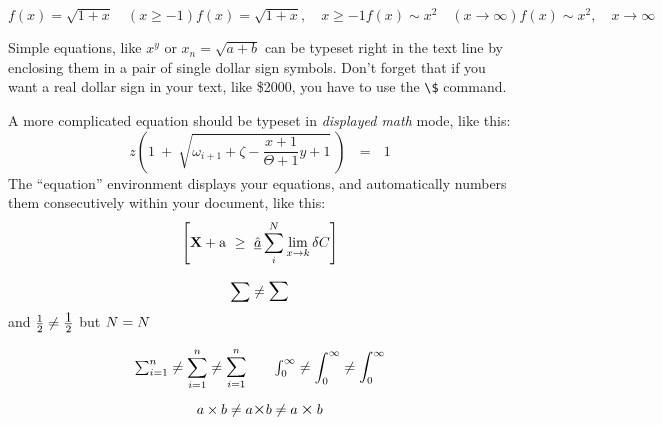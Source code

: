\documentclass[11pt]{article}
\begin{document}
$
f(x) = \sqrt{1+x} \quad (x \ge -1)
f(x) = \sqrt{1+x}, \quad x \ge -1
f(x) \sim x^2 \quad (x\to\infty)
f(x) \sim x^2, \quad x\to\infty
$

Simple equations, like $x^y$ or $x_n = \sqrt{a + b}$ can be typeset right
in the text line by enclosing them in a pair of single dollar sign symbols.
Don't forget that if you want a real dollar sign in your text, like \$2000,
you have to use the \verb+\$+ command.

A more complicated equation should be typeset in {\em displayed math\/} mode,
like this:
\[
z \left( 1 \ +\ \sqrt{\omega_{i+1} + \zeta -\frac{x+1}{\Theta +1} y + 1}
\ \right)
\ \ \ =\ \ \ 1
\]
The ``equation'' environment displays your equations, and automatically
numbers them consecutively within your document, like this:
\begin{equation}
\left[
{\bf X} + {\rm a} \ \geq\
\underline{\hat a} \sum_i^N \lim_{x \rightarrow k} \delta C
\right]
\end{equation}


\[ \sum \neq \mathlarger{\sum} \] 
and $\frac{1}{2} \neq \frac{\mathlarger 1} 
{2}$ but $N = \mathlarger {N}$ 


\[ \mathsmaller\sum_{i=1}^n \neq 
\sum_{i=1}^n \neq \mathlarger\sum_{i=1}^n 
\qquad \mathsmaller\int_0^\infty \neq 
\int_0^\infty \neq \mathlarger\int_0^\infty 
\] 


\[ a \times b \neq a \mathlarger{\times} b \neq 
a \mathbin{\mathlarger\times} b \]
\end{document}
